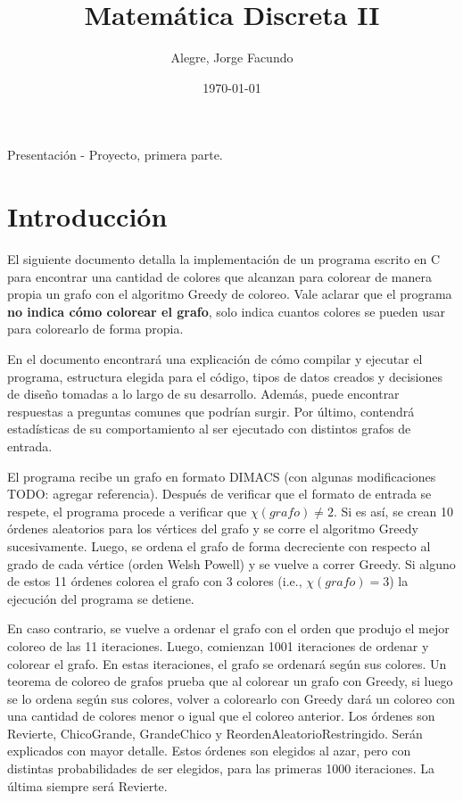 \documentclass[11pt]{article}   	%
\title{\vspace*{\fill}Matemática Discreta II}
\author{Alegre, Jorge Facundo}
\date{\today}
\begin{document}
\maketitle
\thispagestyle{empty}
\begin{center}
Presentación - Proyecto, primera parte.
\end{center}
\vspace*{\fill}
\clearpage

\tableofcontents
\clearpage

\section{Introducción}
El siguiente documento detalla la implementación de un programa escrito en C para encontrar una cantidad
de colores que alcanzan para colorear de manera propia un grafo con el algoritmo Greedy de coloreo.
Vale aclarar que el programa \textbf{no indica cómo colorear el grafo}, solo indica cuantos colores se
pueden usar para colorearlo de forma propia.

En el documento encontrará una explicación de cómo compilar y ejecutar el programa, 
estructura elegida para el código, tipos de datos creados y decisiones de diseño
tomadas a lo largo de su desarrollo.
Además, puede encontrar respuestas a preguntas comunes que podrían surgir.
Por último, contendrá estadísticas de su comportamiento al ser ejecutado con distintos grafos de entrada.

El programa recibe un grafo en formato DIMACS (con algunas modificaciones TODO: agregar referencia). Después
de verificar que el formato de entrada se respete, el programa procede a verificar que $\chi(grafo)\neq2$. Si
es así, se crean 10 órdenes aleatorios para los vértices del grafo y se corre el algoritmo Greedy
sucesivamente. Luego, se ordena el grafo de forma decreciente con respecto al grado de cada vértice (orden
Welsh Powell) y se vuelve a correr Greedy. Si alguno de estos 11 órdenes colorea
el grafo con 3 colores (i.e., $\chi(grafo)=3$) la ejecución del programa se detiene.

En caso contrario, se vuelve a ordenar el grafo con el orden que produjo el mejor coloreo de las 11
iteraciones. Luego, comienzan
1001 iteraciones de ordenar y colorear el grafo. En estas iteraciones, el grafo se ordenará según sus
colores. Un teorema de coloreo de grafos prueba que al colorear un grafo con Greedy, si luego se lo ordena
según sus colores, volver a colorearlo con Greedy dará un coloreo con una cantidad de colores menor o igual
que el coloreo anterior. Los órdenes son Revierte, ChicoGrande, GrandeChico y ReordenAleatorioRestringido.
Serán explicados con mayor detalle. Estos órdenes son elegidos al azar, pero con distintas probabilidades
de ser elegidos, para las primeras 1000 iteraciones. La última siempre será Revierte.
\end{document}
